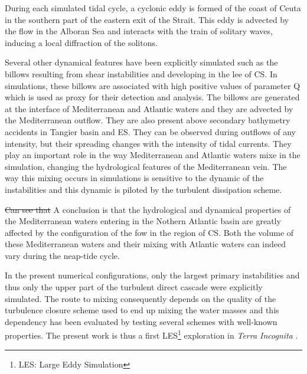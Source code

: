  \color{blue}During \color{black} each simulated tidal cycle, a cyclonic eddy is formed of the coast of Ceuta in the southern part of the eastern exit of the Strait. This eddy is advected by the flow in the Alboran Sea and interacts with the train of solitary waves, \color{blue}inducing a local diffraction of the solitons. \color{black}


\color{blue}Several other dynamical features have been explicitly simulated such as the billows resulting from shear instabilities and developing\color{black} in the lee of CS. In simulations, these billows are associated with high positive values of parameter Q which is used as proxy for their detection and analysis. The billows are generated at the interface of \color{blue} Mediterranean and Atlantic waters and they are advected by the Mediterranean outflow. They are also present above secondary bathymetry accidents in Tangier basin and ES. They can be observed during outflows of any intensity, but their spreading changes with the intensity of tidal currents. They play an important role in the way Mediterranean and Atlantic waters mixe in the simulation, changing the hydrological features of the Mediterranean vein. The way this mixing occurs in simulations is sensitive to the dynamic of the instabilities and this dynamic is piloted by the turbulent dissipation scheme. \color{black}

\sout{Can see that} \color{blue}A conclusion is that the hydrological and dynamical properties of the Mediterranean waters entering in the Nothern Atlantic basin are greatly affected by the configuration of the fow in the region of CS. Both the volume of these Mediterranean waters and their mixing with Atlantic waters can indeed vary during the neap-tide cycle. \color{black}

\color{blue}In the present numerical configurations, only the largest primary instabilities and thus only the upper part of the turbulent direct cascade were explicitly simulated. The route to mixing consequently depends on the quality of the turbulence closure scheme used to end up mixing the water masses and this dependency has been evaluated by testing several schemes with well-known properties. The present work is thus a first LES\footnote{LES: Large Eddy Simulation} exploration in \textit{Terra Incognita} \cite{scotti_large_2010;wyngaard_toward_2004}.\color{black}


